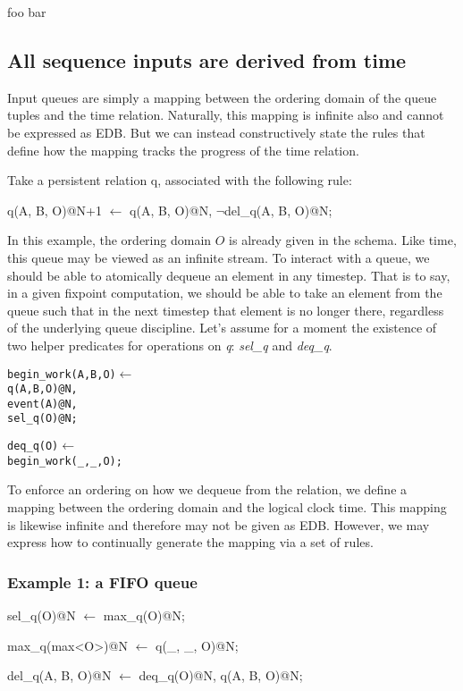 foo bar
\subsection{All sequence inputs are derived from time}

Input queues are simply a mapping between the ordering domain of the queue tuples and the time relation.  Naturally, this mapping
is infinite also and cannot be expressed as EDB.  But we can instead constructively state the rules that define how the mapping 
tracks the progress of the time relation.

Take a persistent relation q, associated with the following rule:

\begin{Dedalus}
q(A, B, O)@N+1 \(\leftarrow\)
  q(A, B, O)@N, 
  \(\lnot\)del\_q(A, B, O)@N;
\end{Dedalus}

In this example, the ordering domain $O$ is already given in the schema.  Like time, this queue may be viewed as an infinite stream.
To interact with a queue, we should be able to atomically dequeue an element in any timestep.  That is to say, in a given fixpoint computation,
we should be able to take an element from the queue such that in the next timestep that element is no longer there, regardless of the
underlying queue discipline.  Let's assume for a moment the existence of two helper predicates for operations on \emph{q}: \emph{sel\_q} and
\emph{deq\_q}.  


\begin{alltt}
begin_work(A, B, O) \(\leftarrow\)
  q(A, B, O)@N,
  event(A)@N, 
  sel_q(O)@N;
  
  
deq_q(O) \(\leftarrow\) 
  begin_work(_, _, O);
\end{alltt}


To enforce an ordering on how we dequeue from the relation, we define a mapping between the ordering domain and the logical clock
time.  This mapping is likewise infinite and therefore may not be given as EDB.  However, we may express how to continually generate 
the mapping via a set of rules.

\subsubsection{Example 1: a FIFO queue}

\begin{Dedalus}
sel\_q(O)@N \(\leftarrow\)
  max\_q(O)@N;

max\_q(max<O>)@N \(\leftarrow\)
  q(\_, \_, O)@N;

del\_q(A, B, O)@N \(\leftarrow\)
  deq\_q(O)@N,
  q(A, B, O)@N;
\end{Dedalus}


